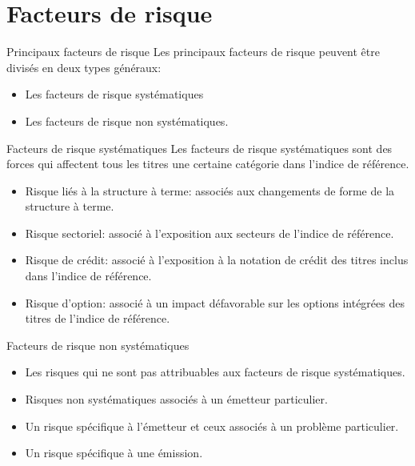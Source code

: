 \documentclass{beamer}
\begin{document}
\section{Facteurs de risque}
\begin{frame}{Principaux facteurs de risque}
Les principaux facteurs de risque peuvent être divisés en deux types généraux: 
\begin{itemize}[label=\bullet]
\item Les facteurs de risque systématiques
\item Les facteurs de risque non systématiques.
\end{itemize}
\end{frame}

\begin{frame}{Facteurs de risque systématiques}
Les facteurs de risque systématiques sont des forces qui affectent tous les titres
une certaine catégorie dans l'indice de référence.
\begin{itemize}[label=\bullet]
\item Risque liés à la structure à terme: associés aux changements de forme de la structure 
à terme.
\item Risque sectoriel: associé à l'exposition aux secteurs de l'indice de référence.
\item Risque de crédit: associé à l'exposition à la notation de crédit des titres inclus dans l'indice de référence.
\item Risque d'option: associé à un impact défavorable sur les options intégrées des titres de l'indice de référence.
\end{itemize}
\end{frame}

\begin{frame}{Facteurs de risque non systématiques}

\begin{itemize}[label=\bullet]
\item Les risques qui ne sont pas attribuables aux facteurs de risque systématiques.
\item Risques non systématiques associés à un émetteur particulier.
\item Un risque spécifique à l'émetteur et ceux associés à un problème particulier.
\item Un risque spécifique à une émission.
\end{itemize}
\end{frame}
\end{document}
